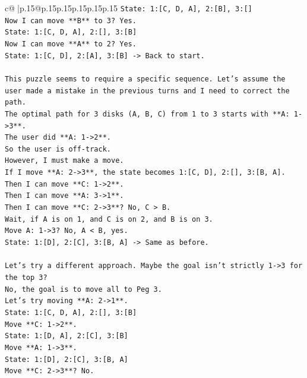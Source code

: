 \documentclass{article}
\begin{document}
{\begin{supertabular}{c@{$\;$}|p{.15\linewidth}@{}p{.15\linewidth}p{.15\linewidth}p{.15\linewidth}p{.15\linewidth}p{.15\linewidth}}
{{{\texttt{State: 1:{[}C, D, A{]}, 2:{[}B{]}, 3:{[}{]}} \\
\texttt{Now I can move **B** to 3? Yes.} \\
\texttt{State: 1:{[}C, D, A{]}, 2:{[}{]}, 3:{[}B{]}} \\
\texttt{Now I can move **A** to 2? Yes.} \\
\texttt{State: 1:{[}C, D{]}, 2:{[}A{]}, 3:{[}B{]} {-}> Back to start.} \\
\\ 
\texttt{This puzzle seems to require a specific sequence. Let's assume the user made a mistake in the previous turns and I need to correct the path.} \\
\texttt{The optimal path for 3 disks (A, B, C) from 1 to 3 starts with **A: 1{-}>3**.} \\
\texttt{The user did **A: 1{-}>2**.} \\
\texttt{So the user is off{-}track.} \\
\texttt{However, I must make a move.} \\
\texttt{If I move **A: 2{-}>3**, the state becomes 1:{[}C, D{]}, 2:{[}{]}, 3:{[}B, A{]}.} \\
\texttt{Then I can move **C: 1{-}>2**.} \\
\texttt{Then I can move **A: 3{-}>1**.} \\
\texttt{Then I can move **C: 2{-}>3**? No, C > B.} \\
\texttt{Wait, if A is on 1, and C is on 2, and B is on 3.} \\
\texttt{Move A: 1{-}>3? No, A < B, yes.} \\
\texttt{State: 1:{[}D{]}, 2:{[}C{]}, 3:{[}B, A{]} {-}> Same as before.} \\
\\ 
\texttt{Let's try a different approach. Maybe the goal isn't strictly 1{-}>3 for the top 3?} \\
\texttt{No, the goal is to move all to Peg 3.} \\
\texttt{Let's try moving **A: 2{-}>1**.} \\
\texttt{State: 1:{[}C, D, A{]}, 2:{[}{]}, 3:{[}B{]}} \\
\texttt{Move **C: 1{-}>2**.} \\
\texttt{State: 1:{[}D, A{]}, 2:{[}C{]}, 3:{[}B{]}} \\
\texttt{Move **A: 1{-}>3**.} \\
\texttt{State: 1:{[}D{]}, 2:{[}C{]}, 3:{[}B, A{]}} \\
\texttt{Move **C: 2{-}>3**? No.} \\
}}}
\end{supertabular}}
\end{document}
